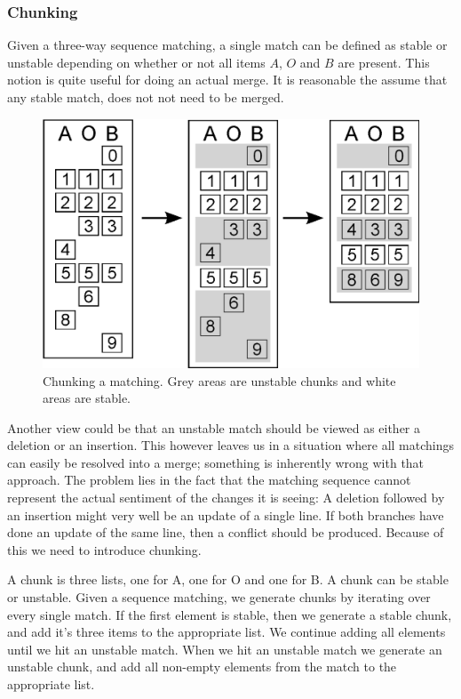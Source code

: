 \documentclass[11pt]{article}
\begin{document}
\subsubsection{Chunking}
Given a three-way sequence matching, a single match can be defined as stable or unstable depending on whether or not all items $A$, $O$ and $B$ are present. This notion is quite useful for doing an actual merge. It is reasonable the assume that any stable match, does not not need to be merged.

\begin{figure}
   \centerline{\includegraphics[scale=0.4]{drawings/eps/threewaymatching-chunking.eps}}
   \caption{Chunking a matching. Grey areas are unstable chunks and white areas are stable.}
   \label{Chunking}
\end{figure}

Another view could be that an unstable match should be viewed as either a deletion or an insertion. This however leaves us in a situation where all matchings can easily be resolved into a merge; something is inherently wrong with that approach. The problem lies in the fact that the matching sequence cannot represent the actual sentiment of the changes it is seeing: A deletion followed by an insertion might very well be an update of a single line. If both branches have done an update of the same line, then a conflict should be produced. Because of this we need to introduce chunking.

A chunk is three lists, one for A, one for O and one for B. A chunk can be stable or unstable. Given a sequence matching, we generate chunks by iterating over every single match. If the first element is stable, then we generate a stable chunk, and add it's three items to the appropriate list. We continue adding all elements until we hit an unstable match. When we hit an unstable match we generate an unstable chunk, and add all non-empty elements from the match to the appropriate list.
\end{document}
